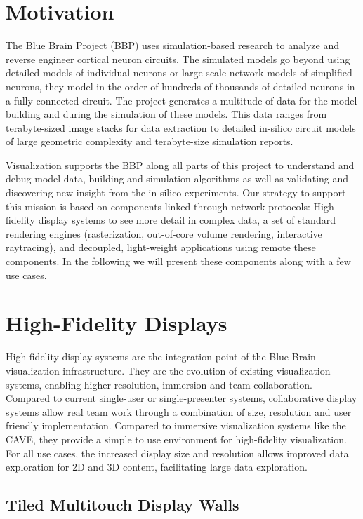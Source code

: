 \documentclass[10pt]{llncs}
\begin{document}
\section{Motivation}

The Blue Brain Project (BBP) uses simulation-based research to analyze and reverse
engineer cortical neuron circuits. The simulated models go beyond using detailed
models of individual neurons or large-scale network models of simplified
neurons, they model in the order of hundreds of thousands of detailed neurons in
a fully connected circuit. The project generates a multitude of data for the
model building and during the simulation of these models. This data ranges from
terabyte-sized image stacks for data extraction to detailed in-silico circuit
models of large geometric complexity and terabyte-size simulation reports.

Visualization supports the BBP along all parts of this project to understand and
debug model data, building and simulation algorithms as well as validating and
discovering new insight from the in-silico experiments. Our strategy to support
this mission is based on components linked through network protocols:
High-fidelity display systems to see more detail in complex data, a set of
standard rendering engines (rasterization, out-of-core volume rendering,
interactive raytracing), and decoupled, light-weight applications using remote
these components. In the following we will present these components along with a
few use cases.


\section{High-Fidelity Displays}

High-fidelity display systems are the integration point of the Blue Brain
visualization infrastructure. They are the evolution of existing visualization
systems, enabling higher resolution, immersion and team collaboration. Compared
to current single-user or single-presenter systems, collaborative display
systems allow real team work through a combination of size, resolution and user
friendly implementation. Compared to immersive visualization systems like the
CAVE, they provide a simple to use environment for high-fidelity visualization.
For all use cases, the increased display size and resolution allows improved
data exploration for 2D and 3D content, facilitating large data exploration.

\subsection{Tiled Multitouch Display Walls}
\end{document}
